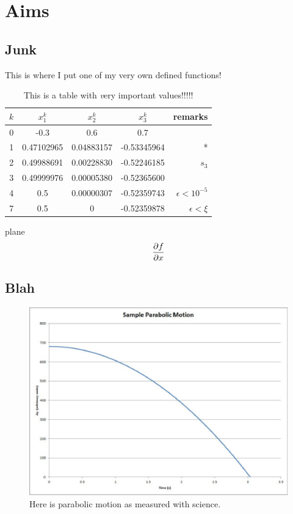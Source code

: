 \chapter{Aims}

\ifpdf
    \graphicspath{{example_chapter/figures/PNG/}{example_chapter/figures/PDF/}{example_chapter/figures/}}
\else
    \graphicspath{{example_chapter/figures/EPS/}{example_chapter/figures/}}
\fi



\section{Junk}
This is where I put one of my very own defined functions!

\begin{table}
\centering
\begin{tabular}{|c|ccc|r|}
	\hline
$k$ &  $x_1^k$    &   $x_2^k$  & $x_3^k$   & remarks  \\
	\hline
0   & -0.3 & 0.6 & 0.7  &  \\
1   & 0.47102965 & 0.04883157 & -0.53345964  & *\\
2   & 0.49988691 & 0.00228830 & -0.52246185 & $s_3$ \\
3   & 0.49999976 & 0.00005380 & -0.52365600  & \\
4   & 0.5 & 0.00000307 & -0.52359743  & $\epsilon < 10^{-5}$ \\
7   & 0.5 & 0 & -0.52359878  & $\epsilon < \xi $ \\
	\hline
\end{tabular}
\caption[A table of important values]{This is a table with {\emph very} important values!!!!!}
\label{important_values}
\end{table}
    
\uv plane
    $$ \frac{\partial f}{\partial x} $$

\section{Blah} 
\lipsum
\begin{figure}
\centering
\includegraphics{parabolic_motion}
\caption[Parabolic Motion]{Here is parabolic motion as measured with science.}
\label{parabolic_motion}
\end{figure}
\lipsum
